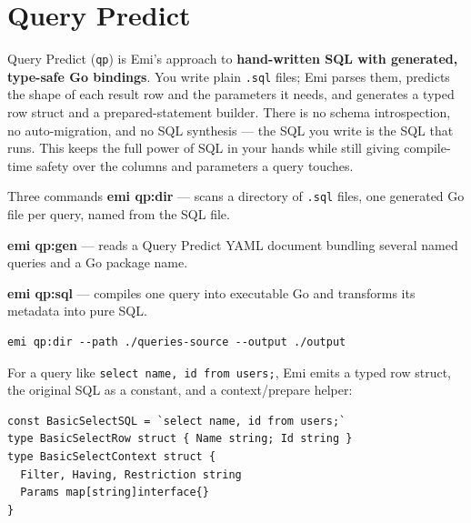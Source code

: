 \section{Query Predict}
\label{sec:query-predict}

Query Predict (\texttt{qp}) is Emi's approach to \textbf{hand-written SQL
with generated, type-safe Go bindings}. You write plain \texttt{.sql}
files; Emi parses them, predicts the shape of each result row and the
parameters it needs, and generates a typed row struct and a
prepared-statement builder. There is no schema introspection, no
auto-migration, and no SQL synthesis --- the SQL you write is the SQL
that runs. This keeps the full power of SQL in your hands while still
giving compile-time safety over the columns and parameters a query
touches.

\begin{sidebar}{Three commands}
\textbf{emi qp:dir} --- scans a directory of \texttt{.sql} files, one
generated Go file per query, named from the SQL file.

\textbf{emi qp:gen} --- reads a Query Predict YAML document bundling
several named queries and a Go package name.

\textbf{emi qp:sql} --- compiles one query into executable Go and
transforms its metadata into pure SQL.
\end{sidebar}

\begin{lstlisting}
emi qp:dir --path ./queries-source --output ./output
\end{lstlisting}
For a query like \texttt{select name, id from users;}, Emi emits a typed
row struct, the original SQL as a constant, and a context/prepare helper:
\begin{lstlisting}
const BasicSelectSQL = `select name, id from users;`
type BasicSelectRow struct { Name string; Id string }
type BasicSelectContext struct {
  Filter, Having, Restriction string
  Params map[string]interface{}
}
\end{lstlisting}

